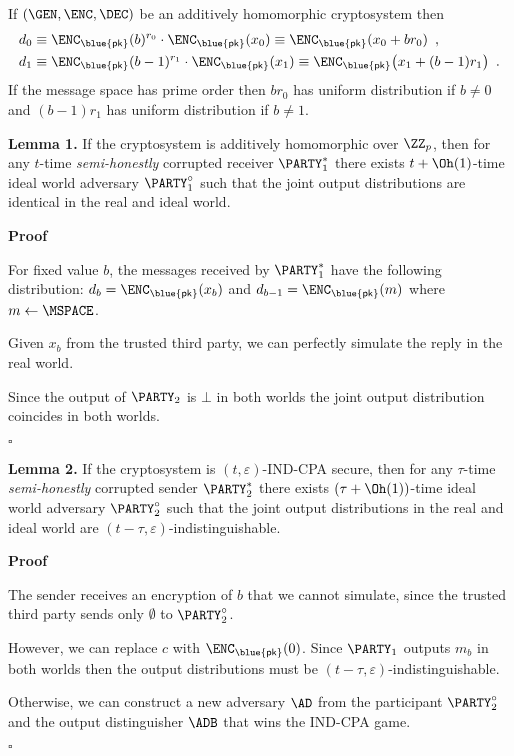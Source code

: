 \documentclass[landscape,dvips,footrule]{foils}
\renewcommand{\PK}{{\blue{\mathsf{pk}}}}
\begin{document}
If $(\GEN,\ENC,\DEC)$ be an additively homomorphic cryptosystem then
\begin{align*}
  d_0&\equiv\ENC_\PK(b)^{r_0}\cdot\ENC_\PK(x_0)\equiv\ENC_\PK(x_0+br_0)\enspace,\\
  d_1&\equiv\ENC_\PK(b-1)^{r_1}\cdot\ENC_\PK(x_1)\equiv\ENC_\PK\bigl(x_1+(b-1)r_1\bigr)\enspace.
\end{align*}
If the message space has prime order then $br_0$ has uniform
distribution if $b\neq 0$ and $(b-1)r_1$ has uniform distribution if
$b\neq 1$.


\textbf{Lemma 1.}  If the cryptosystem is additively homomorphic over
$\ZZ_p$, then for any $t$-time \emph{semi-honestly} corrupted
receiver $\PARTY_1^*$ there exists $t+\Oh(1)$-time ideal world
adversary $\PARTY_1^\circ$ such that the joint output distributions
are identical in the real and ideal world.

\textbf{Proof}
\begin{triangles}
\item For fixed value $b$, the messages received by $\PARTY_1^*$ have
  the following distribution: $d_b=\ENC_\PK(x_b)$ and
  $d_{b-1}=\ENC_\PK(m)$ where $m\gets\MSPACE$.
\item Given $x_b$ from the trusted third party, we can perfectly
  simulate the reply in the real world.
\item Since the output of $\PARTY_2$ is $\bot$ in both worlds the
  joint output distribution coincides in both worlds.
\end{triangles}
$\square$


\textbf{Lemma 2.}  If the cryptosystem is $(t,\varepsilon)$-IND-CPA
secure, then for any $\tau$-time \emph{semi-honestly} corrupted
sender $\PARTY_2^*$ there exists $(\tau+\Oh(1))$-time ideal world adversary
$\PARTY_2^\circ$ such that the joint output distributions in the real
and ideal world are $(t-\tau,\varepsilon)$-indistinguishable.

\textbf{Proof}
\begin{triangles}
\item The sender receives an encryption of $b$ that we cannot
  simulate, since the trusted third party sends only $\emptyset$ to
  $\PARTY_2^\circ$.
\item However, we can replace $c$ with $\ENC_\PK(0)$. Since $\PARTY_1$
  outputs $m_b$ in both worlds then the output distributions must be
  $(t-\tau,\varepsilon)$-indistinguishable.
\item Otherwise, we can construct a new adversary $\AD$ from the
  participant $\PARTY_2^\circ$ and the output distinguisher $\ADB$ that
  wins the IND-CPA game.
\end{triangles}
$\square$
\end{document}

